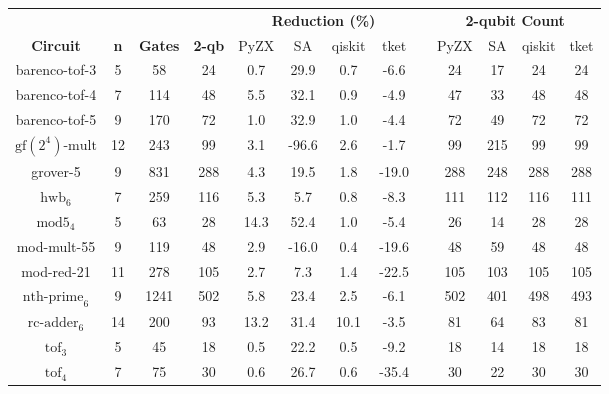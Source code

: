 \begin{table}[t]
  \footnotesize
  \centering
\begin{tabular}{@{}ccccccccccccc@{}}
\toprule
 &
   &
   &
   &
  \multicolumn{4}{c}{\textbf{Reduction (\%)}} &
  \multicolumn{1}{l}{} &
  \multicolumn{4}{c}{\textbf{2-qubit Count}} \\ \cmidrule(lr){5-8} \cmidrule(l){10-13}
\textbf{Circuit} &
  \textbf{n} &
  \textbf{Gates} &
  \textbf{2-qb} &
PyZX &
  SA &
  qiskit &
  tket &
   &
  PyZX &
  SA &
  qiskit &
  tket \\ \midrule
barenco-tof-3                & 5  & 58   & 24  & 0.7  & 29.9  & 0.7  & -6.6  &  & 24  & 17  & 24  & 24  \\
barenco-tof-4                & 7  & 114  & 48  & 5.5  & 32.1  & 0.9  & -4.9  &  & 47  & 33  & 48  & 48  \\
barenco-tof-5                & 9  & 170  & 72  & 1.0  & 32.9  & 1.0  & -4.4  &  & 72  & 49  & 72  & 72  \\
$\text{gf}(2^4)\text{-mult}$ & 12 & 243  & 99  & 3.1  & -96.6 & 2.6  & -1.7  &  & 99  & 215 & 99  & 99  \\
grover-5                     & 9  & 831  & 288 & 4.3  & 19.5  & 1.8  & -19.0 &  & 288 & 248 & 288 & 288 \\
$\text{hwb}_6$               & 7  & 259  & 116 & 5.3  & 5.7   & 0.8  & -8.3  &  & 111 & 112 & 116 & 111 \\
$\text{mod5}_4$              & 5  & 63   & 28  & 14.3 & 52.4  & 1.0  & -5.4  &  & 26  & 14  & 28  & 28  \\
mod-mult-55                  & 9  & 119  & 48  & 2.9  & -16.0 & 0.4  & -19.6 &  & 48  & 59  & 48  & 48  \\
mod-red-21                   & 11 & 278  & 105 & 2.7  & 7.3   & 1.4  & -22.5 &  & 105 & 103 & 105 & 105 \\
$\text{nth-prime}_6$         & 9  & 1241 & 502 & 5.8  & 23.4  & 2.5  & -6.1  &  & 502 & 401 & 498 & 493 \\
$\text{rc-adder}_6$          & 14 & 200  & 93  & 13.2 & 31.4  & 10.1 & -3.5  &  & 81  & 64  & 83  & 81  \\
$\text{tof}_3$               & 5  & 45   & 18  & 0.5  & 22.2  & 0.5  & -9.2  &  & 18  & 14  & 18  & 18  \\
$\text{tof}_4$               & 7  & 75   & 30  & 0.6  & 26.7  & 0.6  & -35.4 &  & 30  & 22  & 30  & 30  \\

\end{tabular}
\end{table}
